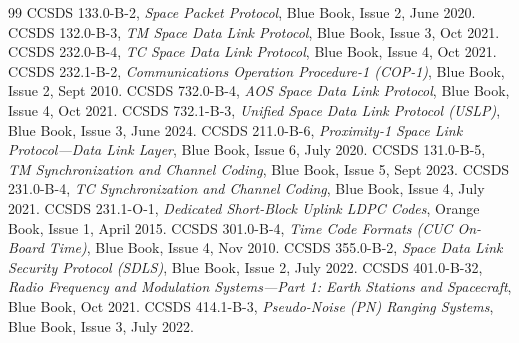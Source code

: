 \documentclass[10pt,a4paper]{article}
\renewcommand{\_}{\origunderscore\penalty0\hskip0pt\relax}
\numberwithin{equation}{section}
\numberwithin{table}{section}
\numberwithin{figure}{section}
\begin{document}
\vspace{-4pt}
\begin{thebibliography}{99}
\scriptsize\setlength{\itemsep}{0.4pt}
 CCSDS 133.0-B-2, \emph{Space Packet Protocol}, Blue Book, Issue 2, June 2020.
 CCSDS 132.0-B-3, \emph{TM Space Data Link Protocol}, Blue Book, Issue 3, Oct 2021.
 CCSDS 232.0-B-4, \emph{TC Space Data Link Protocol}, Blue Book, Issue 4, Oct 2021.
 CCSDS 232.1-B-2, \emph{Communications Operation Procedure-1 (COP-1)}, Blue Book, Issue 2, Sept 2010.
 CCSDS 732.0-B-4, \emph{AOS Space Data Link Protocol}, Blue Book, Issue 4, Oct 2021.
 CCSDS 732.1-B-3, \emph{Unified Space Data Link Protocol (USLP)}, Blue Book, Issue 3, June 2024.
 CCSDS 211.0-B-6, \emph{Proximity-1 Space Link Protocol---Data Link Layer}, Blue Book, Issue 6, July 2020.
 CCSDS 131.0-B-5, \emph{TM Synchronization and Channel Coding}, Blue Book, Issue 5, Sept 2023.
 CCSDS 231.0-B-4, \emph{TC Synchronization and Channel Coding}, Blue Book, Issue 4, July 2021.
 CCSDS 231.1-O-1, \emph{Dedicated Short-Block Uplink LDPC Codes}, Orange Book, Issue 1, April 2015.
 CCSDS 301.0-B-4, \emph{Time Code Formats (CUC On-Board Time)}, Blue Book, Issue 4, Nov 2010.
 CCSDS 355.0-B-2, \emph{Space Data Link Security Protocol (SDLS)}, Blue Book, Issue 2, July 2022.
 CCSDS 401.0-B-32, \emph{Radio Frequency and Modulation Systems---Part 1: Earth Stations and Spacecraft}, Blue Book, Oct 2021.
 CCSDS 414.1-B-3, \emph{Pseudo-Noise (PN) Ranging Systems}, Blue Book, Issue 3, July 2022.
\end{thebibliography}
\end{document}
